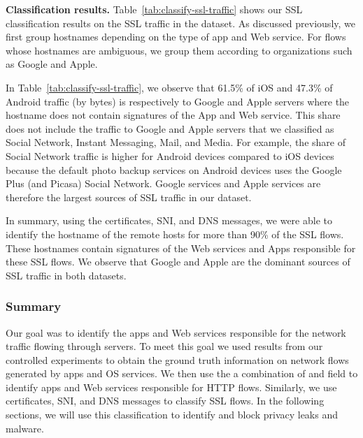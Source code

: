 \noindent\textbf{Classification results.} 
Table~\ref{tab:classify-ssl-traffic} shows our SSL classification results on the SSL traffic in the \mobWild dataset. 
As discussed previously, we first group hostnames depending on the type of app and Web service.
For flows whose hostnames are ambiguous, we group them according to organizations such as Google and Apple.

In Table~\ref{tab:classify-ssl-traffic}, we observe that 61.5\% of iOS and 47.3\% of Android traffic (by bytes) is respectively to Google and Apple servers where the hostname does not contain signatures of the App and Web service.
This share does not include the traffic to Google and Apple servers that we classified as Social Network, Instant Messaging, Mail, and Media.
For example, the share of Social Network traffic is higher for Android devices compared to iOS devices because the default photo backup services on Android devices uses the Google Plus (and Picasa) Social Network.
Google services and Apple services are therefore the largest sources of SSL traffic in our \mobWild dataset.

In summary, using the certificates, SNI, and DNS messages, we were able to identify the hostname of the remote hosts for more than 90\% of the SSL flows.
These hostnames contain signatures of the Web services and Apps responsible for these SSL flows.
We observe that Google and Apple are the dominant sources of SSL traffic in both datasets.

\subsubsection{Summary}

Our goal was to identify the apps and Web services responsible for the network traffic flowing through \meddle servers.
To meet this goal we used results from our controlled experiments to obtain the ground truth information on network flows generated by apps and OS services.
We then use the a combination of \useragent and \httphost field to identify apps and Web services responsible for HTTP flows.
Similarly, we use certificates, SNI, and DNS messages to classify SSL flows.
In the following sections, we will use this classification to identify and block privacy leaks and malware.



